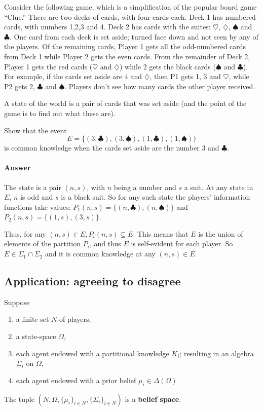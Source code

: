 \documentclass[11pt]{elegantbook_2}
\begin{document}
\begin{example}
    Consider the following game, which is a simplification of the popular board game “Clue.” There are two decks of cards, with four cards each. Deck 1 has numbered cards, with numbers 1,2,3 and 4. Deck 2 has cards with the suites: $\heartsuit$, $\diamondsuit$, $\spadesuit$ and $\clubsuit$. One card from each deck is set aside; turned face down and not seen by any of the players. Of the remaining cards, Player 1 gets all the odd-numbered cards from Deck 1 while Player 2 gets the even cards. From the remainder of Deck 2, Player 1 gets the red cards ($\heartsuit$ and $\diamondsuit$) while 2 gets the black cards ($\spadesuit$ and $\clubsuit$). For example, if the cards set aside are 4 and $\diamondsuit$, then P1 gets 1, 3 and $\heartsuit$, while P2 gets 2, $\clubsuit$ and $\spadesuit$. Players don't see how many cards the other player received.

    A state of the world is a pair of cards that was set aside (and the point of the game is to find out what these are).

    Show that the event
    $$E = \{(3, \clubsuit),(3, \spadesuit),(1, \clubsuit),(1, \spadesuit)\}$$ is common knowledge when the cards set aside are the number 3 and $\clubsuit$.
    \paragraph*{Answer}
    The state is a pair $(n, s)$, with $n$ being a number and $s$ a suit. At any state in $E$, $n$ is odd and $s$ is a black suit. So for any such state the players' information functions take values:
    $P_1(n, s) = \{(n, \clubsuit),(n, \spadesuit)\}$ and $P_2(n, s)= \{(1, s),(3, s)\}$.

    Thus, for any $(n, s) \in E, P_i(n, s) \subseteq E$. This means that $E$ is the union of elements of the partition $P_i$, and thus $E$ is self-evident for each player. So $E \in \Sigma_1 \cap \Sigma_2$ and it is common knowledge at any $(n, s) \in E$.
\end{example}


\subsection{Application: agreeing to disagree}
\begin{definition}
    Suppose
    \begin{enumerate}
        \item a finite set $N$ of players,
        \item a state-space $\Omega$,
        \item each agent endowed with a partitional knowledge $K_i$; resulting in an algebra $\Sigma_i$ on $\Omega$,
        \item each agent endowed with a prior belief $\mu_i\in\Delta(\Omega)$
    \end{enumerate}
    The tuple $\left(N,\Omega,\{\mu_i\}_{i\in N},\{\Sigma_i\}_{i\in N}\right)$ is a \textbf{belief space}.
\end{definition}
\end{document}
